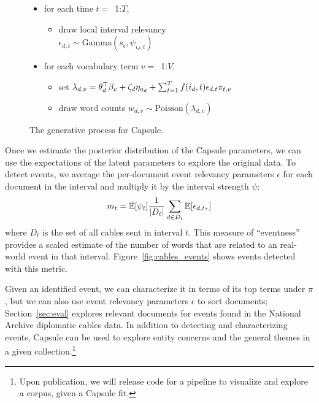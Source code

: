 \begin{figure}[htb]
\begin{mdframed}
\begin{itemize}[leftmargin=*]
\begin{itemize}[leftmargin=*]
\begin{itemize}[leftmargin=*]
		\end{itemize}
	\item for each time $t=$~1:$T$,
		\begin{itemize}[leftmargin=*]
			\item draw local interval relevancy \\$\epsilon_{d,t} \sim \mbox{Gamma}(s_\epsilon, \psi_{i_d,t})$ 
		\end{itemize}
	\item for each vocabulary term $v=$~1:$V$,
		\begin{itemize}[leftmargin=*]
			\item set $\lambda_{d,v} = \\ \theta_d^\top\beta_v  + \zeta_d \eta_{a_d} + \sum_{t=1}^T f(i_d, t) \epsilon_{d,t} \pi_{t,v}$
			\item draw word counts $w_{d,v} \sim \mbox{Poisson}\left(\lambda_{d,v}\right)$
		\end{itemize}
	\end{itemize}
\end{itemize}
\end{mdframed}
\caption{The generative process for Capsule.}
\label{fig:generative-model}
\end{figure}


Once we estimate the posterior distribution of the Capsule parameters, we can use the expectations of the latent parameters to explore the original data.  To detect events, we average the per-document event relevancy parameters $\epsilon$ for each document in the interval and multiply it by the interval strength $\psi$:
\begin{equation}
m_t = \mathbb{E}[\psi_t] \frac{1}{\vert D_t \vert} \sum_{d \in D_t} \mathbb{E}[\epsilon_{d,t},]
\label{eq:eventness}
\end{equation}
where $D_t$ is the set of all cables sent in interval $t$. This measure of ``eventness'' provides a scaled estimate of the number of words that are related to an real-world event in that interval.  Figure~\ref{fig:cables_events} shows events detected with this metric.

Given an identified event, we can characterize it in terms of its top terms under $\pi$, but we can also use event relevancy parameters $\epsilon$ to sort documents; Section~\ref{sec:eval} explores relevant documents for events found in the National Archive diplomatic cables data.
In addition to detecting and characterizing events, Capsule can be used to explore entity concerns and the general themes in a given collection.\footnote{Upon publication, we will release code for a pipeline to visualize and explore a corpus, given a Capsule fit.}

